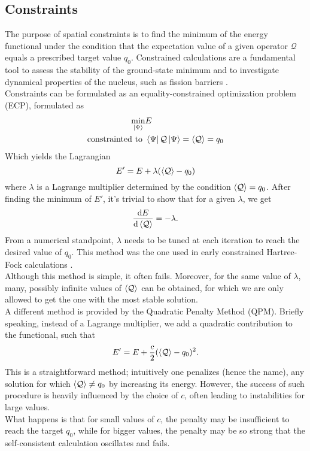 \subsection{Constraints}
\label{sec:alm}
The purpose of spatial constraints is to find the minimum of the energy functional under the condition that the expectation value of a given operator $\mathcal Q$ equals a prescribed target value $q_0$.
Constrained calculations are a fundamental tool to assess the stability of the ground-state minimum and to investigate dynamical properties of the nucleus, such as fission barriers \cite{bonche1985self}.
\\Constraints can be formulated as an equality-constrained optimization problem (ECP), formulated as
\begin{align}
\min_{\ket \Psi}&E 
\\\text{constrainted to } &\bra{\Psi} {\mathcal Q} \ket {\Psi} = \expval{ {\mathcal Q}} = q_0
\end{align}
Which yields the Lagrangian
\begin{equation}
    \label{eq:constr_lagrangian}
    E' = E + \lambda (\expval{{\mathcal Q}}-q_0)
\end{equation}
where $\lambda$ is a Lagrange multiplier determined by the condition $\expval {{\mathcal Q}} = q_0$. 
After finding the minimum of $E'$, it's trivial to show that for a given $\lambda$, we get \cite{FLOCARD1973433}
\begin{equation}
\dv{E}{\expval{{\mathcal Q}}} = -\lambda. 
\end{equation}
From a numerical standpoint, $\lambda$ needs to be tuned at each iteration to reach the desired value of $q_0$. 
This method was the one used in early constrained Hartree-Fock calculations \cite{Cusson1985}.
\\Although this method is simple, it often fails. Moreover, for the same value of $\lambda$, many, possibly infinite values of $\expval{{\mathcal Q}}$ can be obtained, for which we are only allowed to get the one with the most stable solution.
\\A different method is provided by the Quadratic Penalty Method (QPM). Briefly speaking, instead of a Lagrange multiplier, we add a quadratic contribution to the functional, such that
\begin{equation}
    \label{eq:constr_quadratic}
    E' = E + \frac c 2 (\expval{{\mathcal Q}}-q_0)^2.
\end{equation}
This is a straightforward method; intuitively one penalizes (hence the name), any solution for which $\expval{{\mathcal Q}}\neq q_0$ by increasing its energy. However, the success of such procedure is heavily influenced by the choice of $c$, often leading to instabilities for large values.
\\What happens is that for small values of $c$, the penalty may be insufficient to reach the target $q_0$, while for bigger values, the penalty may be so strong that the self-consistent calculation oscillates and fails.
